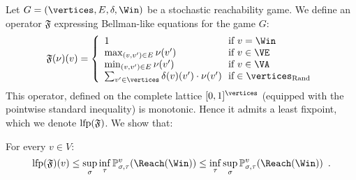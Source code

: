   Let $G = (\vertices,E,\delta,\Win)$ be a stochastic reachability
  game.  We define an operator $\mathfrak{F}$ expressing Bellman-like
  equations for the game $G$:
  \[
  \mathfrak{F}(\nu)(v) = \left\{\begin{array}{l@{~~}l}
      1 & \text{if}\ v = \Win \\
      \max_{(v,v') \in E} \nu(v') & \text{if}\ v \in \VE \\
      \min_{(v,v') \in E} \nu(v') & \text{if}\ v \in \VA \\
      \sum_{v' \in \vertices} \delta(v)(v') \cdot \nu(v') & \text{if} \in \Randomvertices
    \end{array}\right.
  \]
  This operator, defined on the complete lattice $[0,1]^{\vertices}$
  (equipped with the pointwise standard inequality) is
  monotonic. Hence it admits a least fixpoint, which we denote
  $\textrm{lfp}(\mathfrak{F})$.  We show that:
  \begin{lemma}
  \label{6-lem:lfpgeval}
  For every $v \in V$:
    \[
    \lfp(\mathfrak{F}) (v) \le \sup_\sigma \inf_\tau
    \probm_{\sigma,\tau}^v(\Reach(\Win)) \le \inf_\tau \sup_\sigma
    \probm_{\sigma,\tau}^v(\Reach(\Win)) \enspace.
    \]
  \end{lemma}
